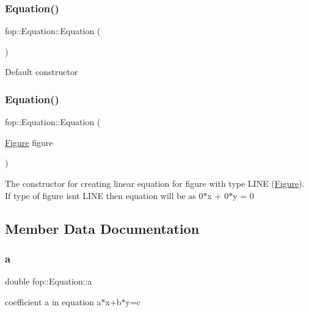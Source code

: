 \subsubsection{\texorpdfstring{Equation()}{Equation()}\hspace{0.1cm}{\footnotesize\ttfamily [1/2]}}
{\footnotesize\ttfamily fop\+::\+Equation\+::\+Equation (\begin{DoxyParamCaption}{ }\end{DoxyParamCaption})}

Default constructor \mbox{\label{structfop_1_1_equation_a93886a166390114aa62609af6ddd1d72}} 
\subsubsection{\texorpdfstring{Equation()}{Equation()}\hspace{0.1cm}{\footnotesize\ttfamily [2/2]}}
{\footnotesize\ttfamily fop\+::\+Equation\+::\+Equation (\begin{DoxyParamCaption}\item[{\mbox{\hyperlink{classfop_1_1_figure}{Figure}}}]{figure }\end{DoxyParamCaption})}

The constructor for creating linear equation for \textquotesingle{}figure\textquotesingle{} with type L\+I\+NE (\mbox{\hyperlink{classfop_1_1_figure}{Figure}}). If type of \textquotesingle{}figure\textquotesingle{} isn\textquotesingle{}t L\+I\+NE then equation will be as 0$\ast$x + 0$\ast$y = 0 

\subsection{Member Data Documentation}
\mbox{\label{structfop_1_1_equation_a9cc4610dcc3a68de1def70a8573cf75f}} 
\subsubsection{\texorpdfstring{a}{a}}
{\footnotesize\ttfamily double fop\+::\+Equation\+::a}

coefficient a in equation a$\ast$x+b$\ast$y=c \mbox{\label{structfop_1_1_equation_a6bf704c5c87c9a321c18869f634a5ff1}} 
